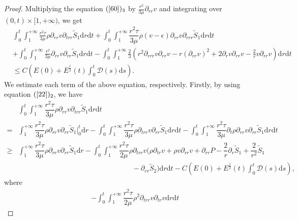\documentclass[10pt,reqno]{amsart}
\numberwithin{equation}{section}
\begin{document}
	\begin{proof}
		Multiplying the equation $(\ref{60})_3$ by $\frac{r^2}{3\mu}\partial_{rr} v$
		and integrating over $(0,t)\times[1,+\infty)$, we get
		\begin{align}\label{70}
				&\int_{0}^{t}\int_{1}^{+\infty}\frac{r^2\tau}{3\mu}\rho\partial_{rr} v\partial_{trr} \tilde{S}_1\mathrm{d}r\mathrm{d}t +\int_{0}^{t}\int_{1}^{+\infty}\dfrac{r^2\tau}{3\mu}\rho (v-\epsilon) \partial_{rr} v\partial_{rrr} \tilde{S}_1\mathrm{d}r\mathrm{d}t\nonumber \\
				& +\int_{0}^{t}\int_{1}^{+\infty}\frac{r^2}{3\mu}\partial_{rr} v\partial_{rr} \tilde{S}_1\mathrm{d}r\mathrm{d}t 
				-\int_{0}^{t}\int_{1}^{+\infty}\frac{2}{3}\left(r^2\partial_{rrr}v \partial_{rr}v-r(\partial_{rr} v)^2+2\partial_{r}v\partial_{rr}v-\frac{2}{r}v\partial_{rr} v\right)\mathrm{d}r\mathrm{d}t \nonumber\\
				&\leq C\left(E(0)+ E^{\frac{1}{2}}(t) \int_{0}^{t}\mathcal{D}(s)\mathrm{d}s\right).
		\end{align}	
		We estimate each term of the above equation, respectively. Firstly, by using equation $(\ref{22})_2$, we have
		\begin{align}\label{71}
				&\int_{0}^{t}\int_{1}^{+\infty}\dfrac{r^2\tau}{3\mu}\rho\partial_{rr} v\partial_{trr} \tilde{S}_1\mathrm{d}r\mathrm{d}t \nonumber \\
				=&
				\int_{1}^{+\infty}\dfrac{r^2\tau}{3\mu}\rho\partial_{rr} v\partial_{rr} \tilde{S}_1\big|_0^t\mathrm{d}r-
				\int_{0}^{t}\int_{1}^{+\infty}\dfrac{r^2\tau}{3\mu}\rho\partial_{trr} v\partial_{rr} \tilde{S}_1\mathrm{d}r\mathrm{d}t-
				\int_{0}^{t}\int_{1}^{+\infty}\dfrac{r^2\tau}{3\mu}\partial_{t}\rho\partial_{rr} v\partial_{rr} \tilde{S}_1\mathrm{d}r\mathrm{d}t \nonumber \\
				\geq& \int_{1}^{+\infty}\dfrac{r^2\tau}{3\mu}\rho\partial_{rr} v\partial_{rr} \tilde{S}_1\mathrm{d}r-
				\int_{0}^{t}\int_{1}^{+\infty}\dfrac{r^2\tau}{2\mu}\rho\partial_{trr} v(\rho\partial_{tr} v+\rho v\partial_{rr} v+\partial_{rr} P-\dfrac{2}{r} \partial_r \tilde{S}_1
				+\dfrac{2}{r^2}\tilde{S}_1 \nonumber \\
				&\qquad\qquad\qquad\qquad\qquad\qquad\qquad\qquad-\partial_{rr} \tilde{S}_2)\mathrm{d}r\mathrm{d}t-C\left(E(0)+ E^{\frac{1}{2}}(t) \int_{0}^{t}\mathcal{D}(s)\mathrm{d}s\right),
			\end{align}
		where 
		\begin{equation}\nonumber
			\begin{aligned}
				&-\int_{0}^{t}\int_{1}^{+\infty}\dfrac{r^2\tau}{2\mu}\rho^2\partial_{trr} v\partial_{tr} v\mathrm{d}r\mathrm{d}t

\end{aligned}
\end{equation}
\end{proof}
\end{document}

